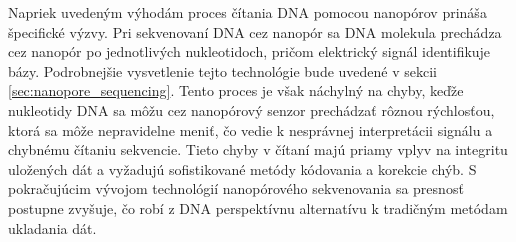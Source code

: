 Napriek uvedeným výhodám proces čítania DNA pomocou nanopórov prináša špecifické výzvy.
Pri sekvenovaní DNA cez nanopór sa DNA molekula prechádza cez nanopór po jednotlivých nukleotidoch,
pričom elektrický signál identifikuje bázy.
Podrobnejšie vysvetlenie tejto technológie bude uvedené v sekcii \ref{sec:nanopore_sequencing}.     
Tento proces je však náchylný na chyby,
keďže nukleotidy DNA sa môžu cez nanopórový senzor prechádzať rôznou rýchlosťou, ktorá sa môže nepravidelne meniť, čo vedie k nesprávnej interpretácii signálu a chybnému čítaniu sekvencie.
Tieto chyby v čítaní majú priamy vplyv na integritu
uložených dát a vyžadujú sofistikované metódy kódovania a korekcie chýb.
S pokračujúcim vývojom technológií nanopórového sekvenovania sa
presnosť postupne zvyšuje, čo robí z DNA perspektívnu alternatívu k tradičným metódam ukladania dát.
